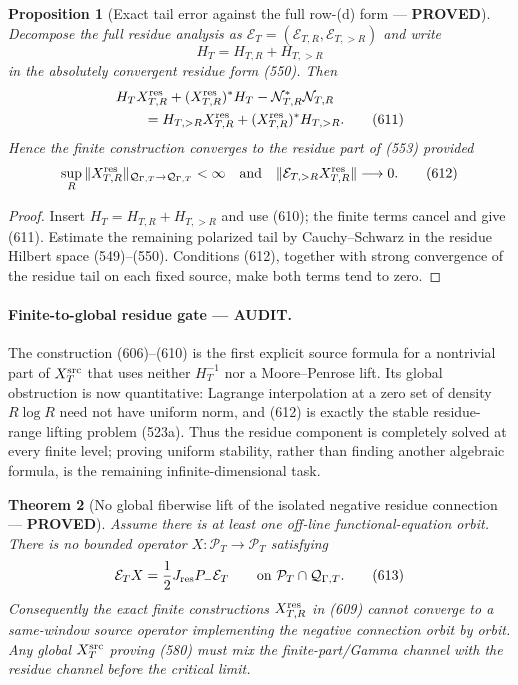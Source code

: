 \documentclass[11pt]{article}
\newtheorem{theorem}{Theorem}
\newtheorem{proposition}[theorem]{Proposition}
\newcommand{\PROVED}{\textcolor{green!45!black}{\textbf{PROVED}}}
\newcommand{\AUDIT}{\textcolor{orange!75!black}{\textbf{AUDIT}}}
\begin{document}
\begin{proposition}[Exact tail error against the full row-(d) form ---
\PROVED]
Decompose the full residue analysis as
\(\mathcal E_T=(\mathcal E_{T,R},\mathcal E_{T,>R})\) and write
\[
 H_T=H_{T,R}+H_{T,>R}
\]
in the absolutely convergent residue form (550).  Then
\begin{align}
 &H_TX_{T,R}^{\rm res}
 +(X_{T,R}^{\rm res})^*H_T
 -\mathcal N_{T,R}^*\mathcal N_{T,R}\notag\\
 &\qquad=
 H_{T,>R}X_{T,R}^{\rm res}
 +(X_{T,R}^{\rm res})^*H_{T,>R}.                     \tag{611}
\end{align}
Hence the finite construction converges to the residue part of (553)
provided
\begin{equation}
 \sup_R\|X_{T,R}^{\rm res}\|_{\mathcal Q_{\Gamma,T}\to
 \mathcal Q_{\Gamma,T}}<\infty
 \quad\text{and}\quad
 \|\mathcal E_{T,>R}X_{T,R}^{\rm res}\|\longrightarrow0.       \tag{612}
\end{equation}
\end{proposition}

\begin{proof}
Insert \(H_T=H_{T,R}+H_{T,>R}\) and use (610); the finite terms cancel and
give (611).  Estimate the remaining polarized tail by Cauchy--Schwarz in
the residue Hilbert space (549)--(550).  Conditions (612), together with
strong convergence of the residue tail on each fixed source, make both
terms tend to zero.
\end{proof}

\paragraph{Finite-to-global residue gate --- \AUDIT.}
The construction (606)--(610) is the first explicit source formula for a
nontrivial part of \(X_T^{\rm src}\) that uses neither \(H_T^{-1}\) nor a
Moore--Penrose lift.  Its global obstruction is now quantitative:
Lagrange interpolation at a zero set of density \(R\log R\) need not have
uniform norm, and (612) is exactly the stable residue-range lifting problem
(523a).  Thus the residue component is completely solved at every finite
level; proving uniform stability, rather than finding another algebraic
formula, is the remaining infinite-dimensional task.

\begin{theorem}[No global fiberwise lift of the isolated negative residue
connection --- \PROVED]
Assume there is at least one off-line functional-equation orbit.  There is
no bounded operator \(X:\mathcal P_T\to\mathcal P_T\) satisfying
\begin{equation}
 \mathcal E_TX=\frac12J_{\rm res}P_-\mathcal E_T
 \qquad\text{on }\mathcal P_T\cap\mathcal Q_{\Gamma,T}.       \tag{613}
\end{equation}
Consequently the exact finite constructions \(X_{T,R}^{\rm res}\) in
(609) cannot converge to a same-window source operator implementing the
negative connection orbit by orbit.  Any global \(X_T^{\rm src}\) proving
(580) must mix the finite-part/Gamma channel with the residue channel before
the critical limit.
\end{theorem}
\end{document}
